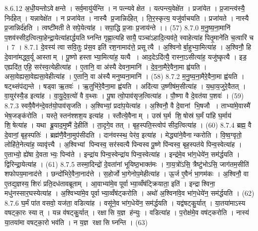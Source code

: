 8.6.12
अ॒धी॒यन्तोऽवेक्षन्ते । सर्व॒मायु॑र्यन्ति । न पत्न्यवेक्षेत । यत्पन्त्य॒वेक्षे॑त । प्रजा॑येत । प्र॒जान्त्व॑स्यै॒ निर्द॑हेत् । यन्नावेक्षे॑त । न प्रजा॑येत । नास्यै प्र॒जान्निर्द॑हेत् । ति॒र॒स्कृत्य॒ यजु॑र्वाचयति । प्रजा॑यते । नास्यै प्र॒जान्निर्द॑हति । त्वष्टी॑मती ते सपे॒येत्या॑ह । सपा॒द्धि प्र॒जाः प्र॒जाय॑न्ते ।। (57)
8.7.0
म॒नु॒ष्य॒ना॒मानि॑ प॒शव॑स्सीद॒त्वित्या॒हेन्द्रा॒येत्या॑हार्द्धयति घ्नन्ति गृह्णा॒त्यहि॑सायै॒ पञ्चा॑ऽहादि॒त्यव॑ते॒ स्वाहेत्या॑ह पितृ॒माने॑ति च॒त्वारि॑ च । 7 ।
8.7.1
दे॒वस्य॑ त्वा सवि॒तुः प्र॑स॒व इति॑ रश॒नामाद॑त्ते॒ प्रसूत्यै । अ॒श्विनोर्बा॒हुभ्या॒मित्या॑ह । अ॒श्विनौ॒ हि दे॒वाना॑मद्ध्व॒र्यू आस्ताम् । पू॒ष्णो हस्ताभ्या॒मित्या॑ह॒ यत्यै । आद॒देऽदि॑त्यै॒ रास्ना॒ऽसीत्या॑ह॒ यजु॑ष्कृत्यै । इड॒ एह्यदि॑त॒ एहि॒ सर॑स्व॒त्येहीत्या॑ह । ए॒तानि॒ वा अ॑स्यै देवना॒मानि॑ । दे॒व॒ना॒मैरे॒वैना॒मा ह्व॑यति । असा॒वेह्यसा॒वेह्यसा॒वेहीत्या॑ह । ए॒तानि॒ वा अ॑स्यै मनुष्यना॒मानि॑ । (58)
8.7.2
म॒नु॒ष्य॒ना॒मैरे॒वैना॒मा ह्व॑यति । षट्थ्संप॑द्यन्ते । षड्वा ऋ॒तवः॑ । ऋ॒तुभि॑रे॒वैना॒मा ह्व॑यति । अदि॑त्या उ॒ष्णीष॑म॒सीत्या॑ह । य॒था॒य॒जुरे॒वैतत् । वा॒युर॑स्यै॒ड इत्या॑ह । वा॒यु॒दे॒व॒त्यो॑ वै व॒थ्सः । पू॒षा त्वो॒पाव॑सृज॒त्वित्या॑ह । पौ॒ष्णा वै दे॒वत॑या प॒शवः॑ । (59)
8.7.3
स्वयै॒वैन॑न्दे॒वत॑यो॒पाव॑सृजति । अ॒श्विभ्यां॒ प्रदा॑प॒येत्या॑ह । अ॒श्विनौ॒ वै दे॒वानां भि॒षजौ । ताभ्या॑मे॒वास्मै॑ भेष॒जङ्क॑रोति । यस्ते॒ स्तन॑श्शश॒य इत्या॑ह । स्तौत्ये॒वैनाम् । उस्र॑ घ॒र्म शि॒॒षोस्र॑ घ॒र्मं पा॑हि घ॒र्माय॑ शि॒॒षेत्या॑ह । यथा ब्रू॒याद॒मुष्मै॑ दे॒हीति॑ । ता॒दृगे॒व तत् । बृह॒स्पति॒स्त्वोप॑ सीद॒त्वित्या॑ह । (60)
8.7.4
ब्रह्म॒ वै दे॒वानां॒ बृह॒स्पतिः॑ । ब्रह्म॑णै॒वैना॒मुप॑सीदति । दान॑वस्स्थ॒ पेर॑व॒ इत्या॑ह । मेद्ध्या॑ने॒वैनान्करोति । वि॒ष्व॒ग्वृतो॒ लोहि॑ते॒नेत्या॑ह॒ व्यावृ॑त्त्यै । अ॒श्विभ्यां पिन्वस्व॒ सर॑स्वत्यै पिन्वस्व पू॒ष्णे पि॑न्वस्व॒ बृह॒स्पत॑ये पिन्व॒स्वेत्या॑ह । ए॒ताभ्यो॒ ह्ये॑षा दे॒वताभ्यः॒ पिन्व॑ते । इन्द्रा॑य पिन्व॒स्वेन्द्रा॑य पिन्व॒स्वेत्या॑ह । इन्द्र॑मे॒व भा॑ग॒धेये॑न॒ सम॑र्द्धयति । द्विरिन्द्रा॒येत्या॑ह । (61)
8.7.5
तस्मा॒दिन्द्रो॑ दे॒वता॑नां भूयिष्ठ॒भाक्त॑मः । गा॒य॒त्रो॑ऽसि॒ त्रैष्टु॑भोऽसि॒ जाग॑तम॒सीति॑ शफोपय॒मानाद॑त्ते । छन्दो॑भिरे॒वैना॒नाद॑त्ते । स॒होर्जो भा॒गेनोप॒मेहीत्या॑ह । ऊ॒र्ज ए॒वैनं॑ भा॒गम॑कः । अ॒श्विनौ॒ वा ए॒तद्य॒ज्ञस्य॒ शिरः॑ प्रति॒दध॑तावब्रूताम् । आ॒वाभ्या॑मे॒व पूर्वाभ्या॒व्वँष॑ट्क्रियाता॒ इति॑ । इन्द्राश्विना॒ मधु॑नस्सार॒घस्येत्या॑ह । अ॒श्विभ्या॑मे॒व पूर्वाभ्या॒व्वँष॑ट्करोति । अथो॑ अ॒श्विना॑वे॒व भा॑ग॒धेये॑न॒ सम॑र्द्धयति । (62)
8.7.6
घ॒र्मं पा॑त वसवो॒ यज॑ता॒ वडित्या॑ह । वसू॑ने॒व भा॑ग॒धेये॑न॒ सम॑र्द्धयति । यद्व॑षट्कु॒र्यात् । या॒तया॑माऽस्य वषट्का॒रः स्यात् । यन्न व॑षट्कु॒र्यात् । रक्षा॑सि य॒ज्ञ ह॑न्युः । वडित्या॑ह । प॒रोक्ष॑मे॒व वष॑ट्करोति । नास्य॑ या॒तया॑मा वषट्का॒रो भव॑ति । न य॒ज्ञ रक्षा॑सि घ्नन्ति । (63)
